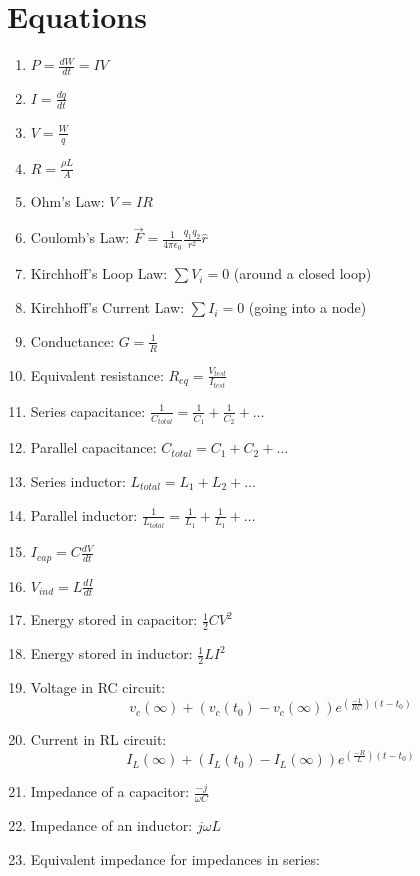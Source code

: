 \documentclass[twocolumn]{article}
\begin{document}
\section*{Equations}
\pagestyle{empty}

\begin{enumerate}
    \item $P = \frac{dW}{dt} = IV$
    \item $I = \frac{dq}{dt}$
    \item $V = \frac{W}{q}$
    \item $R = \frac{\rho L}{A}$
    \item Ohm's Law: $V=IR$
    \item Coulomb's Law: $\vec{F} = \frac{1}{4\pi \epsilon_0}\frac{q_1 q_2}{r^2}\hat{r}$
    \item Kirchhoff's Loop Law: $\sum V_i = 0$ (around a closed loop)
    \item Kirchhoff's Current Law: $\sum I_i = 0$ (going into a node)
    \item Conductance: $G = \frac{1}{R}$
    \item Equivalent resistance: $R_{eq} = \frac{V_{test}}{I_{test}}$
    \item Series capacitance: $\frac{1}{C_{total}} = \frac{1}{C_1} + \frac{1}{C_2} + \dots$
    \item Parallel capacitance: $C_{total} = C_1 + C_2 + \dots$
    \item Series inductor: $L_{total} = L_1+L_2+\dots$
    \item Parallel inductor: $\frac{1}{L_{total}} = \frac{1}{L_1} + \frac{1}{L_1} + \dots$
    \item $I_{cap} = C \frac{dV}{dt}$
    \item $V_{ind} = L \frac{dI}{dt}$
    \item Energy stored in capacitor: $\frac{1}{2}CV^2$
    \item Energy stored in inductor: $\frac{1}{2}LI^2$
    \item Voltage in RC circuit: 
    \[v_c(\infty) +\left(v_c(t_0) - v_c(\infty)\right)e^{(\frac{-1}{RC})(t - t_0)}\]
    \item Current in RL circuit: 
    \[I_L(\infty) +\left(I_L(t_0) - I_L(\infty)\right)e^{(\frac{-R}{L})(t - t_0)}\]
    \item Impedance of a capacitor: $\frac{-j}{\omega C}$
    \item Impedance of an inductor: $j \omega L$
    \item Equivalent impedance for impedances in series: 

\end{enumerate}
\end{document}

